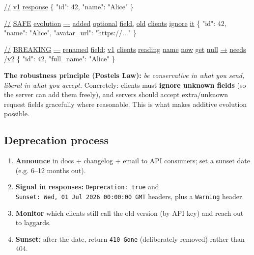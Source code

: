 \documentclass[11pt]{article}
\providecommand{\tightlist}{\setlength{\itemsep}{1pt}\setlength{\parskip}{0pt}}
\newenvironment{Shaded}{\begin{snugshade}}{\end{snugshade}}
\newcommand{\DataTypeTok}[1]{\textcolor[rgb]{0.16,0.50,0.73}{#1}}
\newcommand{\DecValTok}[1]{\textcolor[rgb]{0.96,0.45,0.00}{#1}}
\newcommand{\ErrorTok}[1]{\textcolor[rgb]{0.85,0.27,0.33}{\underline{#1}}}
\newcommand{\FunctionTok}[1]{\textcolor[rgb]{0.56,0.27,0.68}{#1}}
\newcommand{\StringTok}[1]{\textcolor[rgb]{0.96,0.31,0.31}{#1}}
\begin{document}
\begin{Shaded}
\begin{Highlighting}[]
\ErrorTok{//} \ErrorTok{v1} \ErrorTok{response}
\FunctionTok{\{} \DataTypeTok{"id"}\FunctionTok{:} \DecValTok{42}\FunctionTok{,} \DataTypeTok{"name"}\FunctionTok{:} \StringTok{"Alice"} \FunctionTok{\}}

\ErrorTok{//} \ErrorTok{SAFE} \ErrorTok{evolution} \ErrorTok{—} \ErrorTok{added} \ErrorTok{optional} \ErrorTok{field,} \ErrorTok{old} \ErrorTok{clients} \ErrorTok{ignore} \ErrorTok{it}
\FunctionTok{\{} \DataTypeTok{"id"}\FunctionTok{:} \DecValTok{42}\FunctionTok{,} \DataTypeTok{"name"}\FunctionTok{:} \StringTok{"Alice"}\FunctionTok{,} \DataTypeTok{"avatar\_url"}\FunctionTok{:} \StringTok{"https://..."} \FunctionTok{\}}

\ErrorTok{//} \ErrorTok{BREAKING} \ErrorTok{—} \ErrorTok{renamed} \ErrorTok{field;} \ErrorTok{v1} \ErrorTok{clients} \ErrorTok{reading} \ErrorTok{\textasciigrave{}name\textasciigrave{}} \ErrorTok{now} \ErrorTok{get} \ErrorTok{null} \ErrorTok{→} \ErrorTok{needs} \ErrorTok{/v2}
\FunctionTok{\{} \DataTypeTok{"id"}\FunctionTok{:} \DecValTok{42}\FunctionTok{,} \DataTypeTok{"full\_name"}\FunctionTok{:} \StringTok{"Alice"} \FunctionTok{\}}
\end{Highlighting}
\end{Shaded}

\textbf{The robustness principle (Postel\textquotesingle s Law):} \emph{be conservative in what you send, liberal in what you accept.} Concretely: clients must \textbf{ignore unknown fields} (so the server can add them freely), and servers should accept extra/unknown request fields gracefully where reasonable. This is what makes additive evolution possible.

\subsection{Deprecation process}\label{deprecation-process}

\begin{enumerate}
\def\labelenumi{\arabic{enumi}.}
\tightlist
\item
  \textbf{Announce} in docs + changelog + email to API consumers; set a sunset date (e.g. 6--12 months out).
\item
  \textbf{Signal in responses:} \texttt{Deprecation:\ true} and \texttt{Sunset:\ Wed,\ 01\ Jul\ 2026\ 00:00:00\ GMT} headers, plus a \texttt{Warning} header.
\item
  \textbf{Monitor} which clients still call the old version (by API key) and reach out to laggards.
\item
  \textbf{Sunset:} after the date, return \texttt{410\ Gone} (deliberately removed) rather than 404.
\end{enumerate}
\end{document}

